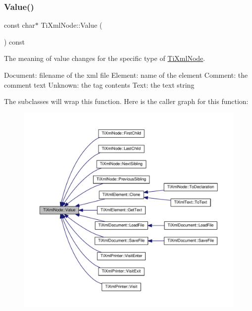 \subsubsection{\texorpdfstring{Value()}{Value()}}
{\footnotesize\ttfamily const char$\ast$ Ti\+Xml\+Node\+::\+Value (\begin{DoxyParamCaption}{ }\end{DoxyParamCaption}) const\hspace{0.3cm}{\ttfamily [inline]}}

The meaning of \textquotesingle{}value\textquotesingle{} changes for the specific type of \hyperlink{class_ti_xml_node}{Ti\+Xml\+Node}. \begin{DoxyVerb}Document:   filename of the xml file
Element:    name of the element
Comment:    the comment text
Unknown:    the tag contents
Text:       the text string
\end{DoxyVerb}


The subclasses will wrap this function. Here is the caller graph for this function\+:
\nopagebreak
\begin{figure}[H]
\begin{center}
\leavevmode
\includegraphics[width=350pt]{class_ti_xml_node_ad44dfe927d49a74dd78b72b7514417ad_icgraph}
\end{center}
\end{figure}
\mbox{\label{class_ti_xml_node_a74c4ea4a91c0a91900c919f69f657d6a}} 
